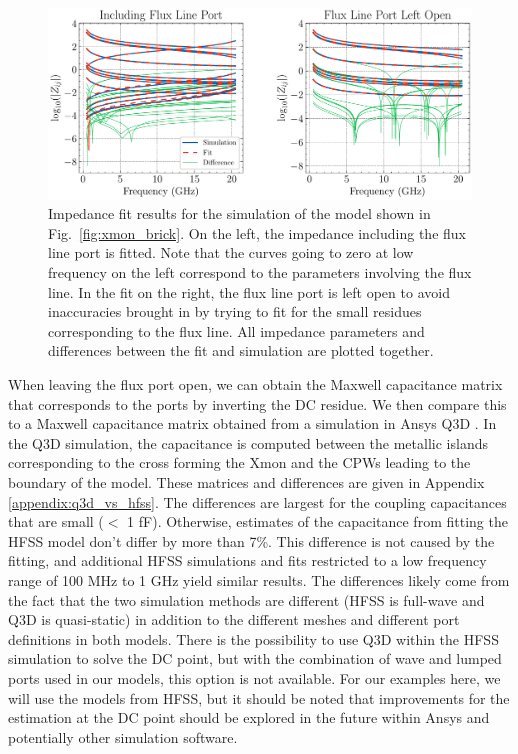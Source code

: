 \begin{figure}[!t]
    \centering
    \includegraphics[width=\textwidth]{figures/xmon_fit.pdf}
    \caption{Impedance fit results for the simulation of the model shown in Fig.\ \ref{fig:xmon_brick}. On the left, the impedance including the flux line port is fitted. Note that the curves going to zero at low frequency on the left correspond to the parameters involving the flux line. In the fit on the right, the flux line port is left open to avoid inaccuracies brought in by trying to fit for the small residues corresponding to the flux line. All impedance parameters and differences between the fit and simulation are plotted together.}
    \label{fig:xmon_fit}
\end{figure}

When leaving the flux port open, we can obtain the Maxwell capacitance matrix that corresponds to the ports by inverting the DC residue. We then compare this to a Maxwell capacitance matrix obtained from a simulation in Ansys Q3D \cite{ansys_q3d}. In the Q3D simulation, the capacitance is computed between the metallic islands corresponding to the cross forming the Xmon and the CPWs leading to the boundary of the model. These matrices and differences are given in Appendix \ref{appendix:q3d_vs_hfss}. The differences are largest for the coupling capacitances that are small ($<$ 1 fF). Otherwise, estimates of the capacitance from fitting the HFSS model don't differ by more than 7\%. This difference is not caused by the fitting, and additional HFSS simulations and fits restricted to a low frequency range of 100 MHz to 1 GHz yield similar results. The differences likely come from the fact that the two simulation methods are different (HFSS is full-wave and Q3D is quasi-static) in addition to the different meshes and different port definitions in both models. There is the possibility to use Q3D within the HFSS simulation to solve the DC point, but with the combination of wave and lumped ports used in our models, this option is not available. For our examples here, we will use the models from HFSS, but it should be noted that improvements for the estimation at the DC point should be explored in the future within Ansys and potentially other simulation software.

